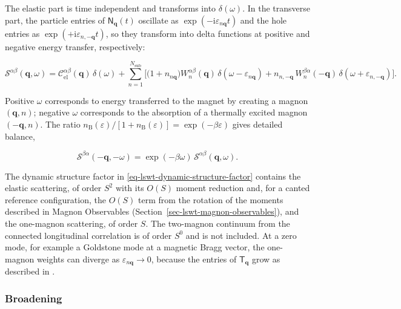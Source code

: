 The elastic part is time independent and transforms into \(\delta(\omega)\). In the transverse part, the particle entries of \(\mathsf N_{\mathbf q}(t)\) oscillate as \(\exp(-\mathrm i\varepsilon_{n\mathbf q}t)\) and the hole entries as \(\exp(+\mathrm i\varepsilon_{n,-\mathbf q}t)\), so they transform into delta functions at positive and negative energy transfer, respectively:

\begin{equation}\label{eq-lswt-dynamic-structure-factor}
\mathcal S^{\alpha\beta}(\mathbf q,\omega)
=\mathcal C_{\mathrm{el}}^{\alpha\beta}(\mathbf q)\,\delta(\omega)
+\sum_{n=1}^{N_{\mathrm{sub}}}\Big[\big(1+n_{n\mathbf q}\big)W_n^{\alpha\beta}(\mathbf q)\,\delta(\omega-\varepsilon_{n\mathbf q})
+n_{n,-\mathbf q}\,W_n^{\beta\alpha}(-\mathbf q)\,\delta(\omega+\varepsilon_{n,-\mathbf q})\Big].
\end{equation}

Positive \(\omega\) corresponds to energy transferred to the magnet by creating a magnon \((\mathbf q,n)\); negative \(\omega\) corresponds to the absorption of a thermally excited magnon \((-\mathbf q,n)\). The ratio \(n_{\mathrm B}(\varepsilon)/[1+n_{\mathrm B}(\varepsilon)]=\exp(-\beta\varepsilon)\) gives detailed balance,

\begin{equation}\label{eq-lswt-detailed-balance}
\mathcal S^{\beta\alpha}(-\mathbf q,-\omega)=\exp(-\beta\omega)\,\mathcal S^{\alpha\beta}(\mathbf q,\omega).
\end{equation}

The dynamic structure factor in \eqref{eq-lswt-dynamic-structure-factor} contains the elastic scattering, of order \(S^2\) with its \(O(S)\) moment reduction and, for a canted reference configuration, the \(O(S)\) term from the rotation of the moments described in Magnon Observables (Section~\ref{sec-lswt-magnon-observables}), and the one-magnon scattering, of order \(S\). The two-magnon continuum from the connected longitudinal correlation is of order \(S^0\) and is not included. At a zero mode, for example a Goldstone mode at a magnetic Bragg vector, the one-magnon weights can diverge as \(\varepsilon_{n\mathbf q}\to0\), because the entries of \(\mathsf T_{\mathbf q}\) grow as described in .

\subsubsection{Broadening}

